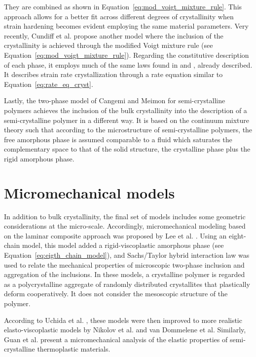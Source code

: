 They are combined as shown in Equation~\eqref{eq:mod_voigt_mixture_rule}.
This approach allows for a better fit across different degrees of crystallinity when strain hardening becomes evident employing the same material parameters.
Very recently, Cundiff et al. \citep{cundiffModelingViscoplasticBehavior2022} propose another model where the inclusion of the crystallinity is achieved through the modified Voigt mixture rule (see Equation~\eqref{eq:mod_voigt_mixture_rule}).
Regarding the constitutive description of each phase, it employs much of the same laws found in \cite{ahziModelingDeformationBehavior2003} and \cite{chowdhuryEffectsManufacturingInducedVoids2008}, already described.
It describes strain rate crystallization through a rate equation similar to Equation~\eqref{eq:rate_eq_cryst}.

Lastly, the two-phase model of Cangemi and Meimon for semi-crystalline polymers \citep{cangemiTwoPhaseModelMechanical2001} achieves the inclusion of the bulk crystallinity into the description of a semi-crystalline polymer in a different way.
It is based on the continuum mixture theory such that according to the microstructure of semi-crystalline polymers, the free amorphous phase is assumed comparable to a fluid which saturates the complementary space to that of the solid structure, the crystalline phase plus the rigid amorphous phase.

\section{Micromechanical models}

In addition to bulk crystallinity, the final set of models includes some geometric considerations at the micro-scale.
Accordingly, micromechanical modeling based on the laminar composite approach was proposed by Lee et al. \citep{leeMicromechanicalModelingLarge1993, leeSimulationLargeStrain1993}.
Using an eight-chain model, this model added a rigid-viscoplastic amorphous phase (see Equation~\eqref{eq:eigth_chain_model}), and Sachs/Taylor hybrid interaction law was used to relate the mechanical properties of microscopic two-phase inclusion and aggregation of the inclusions.
In these models, a crystalline polymer is regarded as a polycrystalline aggregate of randomly distributed crystallites that plastically deform cooperatively.
It does not consider the mesoscopic structure of the polymer.

According to Uchida et al. \citep{uchidaMicroMesoMacroscopic2013}, these models were then improved to more realistic elasto-viscoplastic models by Nikolov et al. \citep{nikolovMicroMacroConstitutive2000, nikolovMultiscaleConstitutiveModeling2002} and van Dommelene et al. \citep{vandommelenMicromechanicalModelingElastoviscoplastic2003}
Similarly, Guan et al. \citep{guanMicromechanicalModelElastic2004} present a micromechanical analysis of the elastic properties of semi-crystalline thermoplastic materials.

